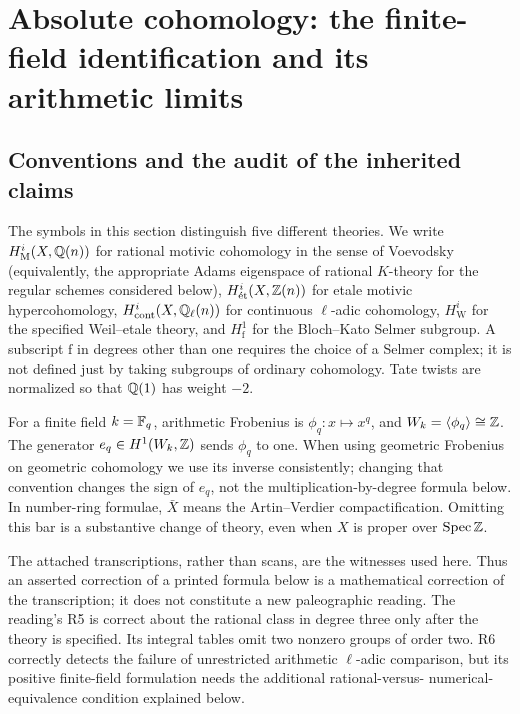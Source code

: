 \section{Absolute cohomology: the finite-field identification and its arithmetic limits}\label{sec:part-b}
\providecommand{\BW}{\mathrm W}
\providecommand{\BM}{\mathrm M}
\providecommand{\Bcts}{\mathrm{cont}}
\providecommand{\Bf}{\mathrm f}
\providecommand{\Bc}{\mathrm c}
\providecommand{\Bcorank}{\operatorname{corank}}
\providecommand{\BPic}{\operatorname{Pic}}
\providecommand{\BCl}{\operatorname{Cl}}
\providecommand{\Br}{\operatorname{Br}}
\providecommand{\BCH}{\operatorname{CH}}
\providecommand{\BRHom}{\operatorname{RHom}}
\providecommand{\BRGamma}{\operatorname{R\Gamma}}

\subsection{Conventions and the audit of the inherited claims}
The symbols in this section distinguish five different theories.  We write
\(H^i_{\BM}(X,\Q(n))\) for rational motivic cohomology in the sense of
Voevodsky (equivalently, the appropriate Adams eigenspace of rational
\(K\)-theory for the regular schemes considered below),
\(H^i_{\mathrm{\acute et}}(X,\mathbb Z(n))\) for etale motivic hypercohomology,
\(H^i_{\Bcts}(X,\Q_\ell(n))\) for continuous \(\ell\)-adic cohomology,
\(H^i_{\BW}\) for the specified Weil--etale theory, and
\(H^1_{\Bf}\) for the Bloch--Kato Selmer subgroup.  A subscript \(\Bf\)
in degrees other than one requires the choice of a Selmer complex; it is
not defined just by taking subgroups of ordinary cohomology.  Tate twists
are normalized so that \(\mathbb Q(1)\) has weight \(-2\).

For a finite field \(k=\mathbb F_q\), arithmetic Frobenius is
\(\phi_q:x\mapsto x^q\), and \(W_k=\langle\phi_q\rangle\cong\mathbb Z\).
The generator \(e_q\in H^1(W_k,\mathbb Z)\) sends \(\phi_q\) to one.
When using geometric Frobenius on geometric cohomology we use its inverse
consistently; changing that convention changes the sign of \(e_q\), not
the multiplication-by-degree formula below.  In number-ring formulae,
\(\bar X\) means the Artin--Verdier compactification.  Omitting this bar
is a substantive change of theory, even when \(X\) is proper over
\(\operatorname{Spec}\mathbb Z\).

The attached transcriptions, rather than scans, are the witnesses used
here.  Thus an asserted correction of a printed formula below is a
mathematical correction of the transcription; it does not constitute a
new paleographic reading.  The reading's R5 is correct about the rational
class in degree three only after the theory is specified.  Its integral
tables omit two nonzero groups of order two.  R6 correctly detects the
failure of unrestricted arithmetic \(\ell\)-adic comparison, but its
positive finite-field formulation needs the additional rational-versus-
numerical-equivalence condition explained below.

